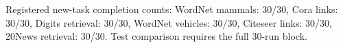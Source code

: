 Registered new-task completion counts: WordNet mammals: 30/30, Cora links: 30/30, Digits retrieval: 30/30, WordNet vehicles: 30/30, Citeseer links: 30/30, 20News retrieval: 30/30. Test comparison requires the full 30-run block.\par
